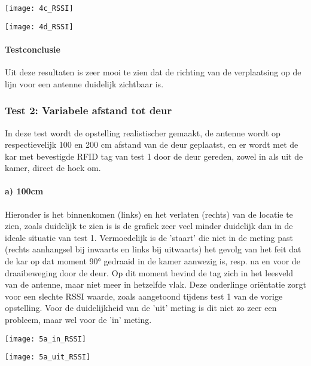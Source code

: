 \begin{minipage}{0.42\textwidth}
	\texttt{[image: 4c\_RSSI]}
	\label{fig:ond-rfid-static-4c-res}
\end{minipage}
\hfill
\begin{minipage}{0.42\textwidth}
	\texttt{[image: 4d\_RSSI]}
	\label{fig:ond-rfid-static-4d-res}
\end{minipage}

\paragraph{Testconclusie}
Uit deze resultaten is zeer mooi te zien dat de richting van de verplaatsing op de lijn voor een antenne duidelijk zichtbaar is.

\subsubsection{Test 2: Variabele afstand tot deur}
In deze test wordt de opstelling realistischer gemaakt, de antenne wordt op respectievelijk 100 en 200 cm afstand van de deur geplaatst, en er wordt met de kar met bevestigde RFID tag van test 1 door de deur gereden, zowel in als uit de kamer, direct de hoek om. 

\paragraph{a) 100cm}
Hieronder is het binnenkomen (links) en het verlaten (rechts) van de locatie te zien, zoals duidelijk te zien is is de grafiek zeer veel minder duidelijk dan in de ideale situatie van test 1. Vermoedelijk is de 'staart' die niet in de meting past (rechts aanhangsel bij inwaarts en links bij uitwaarts) het gevolg van het feit dat de kar op dat moment 90° gedraaid in de kamer aanwezig is, resp. na en voor de draaibeweging door de deur. Op dit moment bevind de tag zich in het leesveld van de antenne, maar niet meer in hetzelfde vlak. Deze onderlinge oriëntatie zorgt voor een slechte RSSI waarde, zoals aangetoond tijdens test 1 van de vorige opstelling. Voor de duidelijkheid van de 'uit' meting is dit niet zo zeer een probleem, maar wel voor de 'in' meting.

\begin{minipage}{0.42\textwidth}
	\texttt{[image: 5a\_in\_RSSI]}
	\label{fig:ond-rfid-static-5ain-res}
\end{minipage}
\hfill
\begin{minipage}{0.42\textwidth}
	\texttt{[image: 5a\_uit\_RSSI]}
	\label{fig:ond-rfid-static-5auit-res}
\end{minipage}

